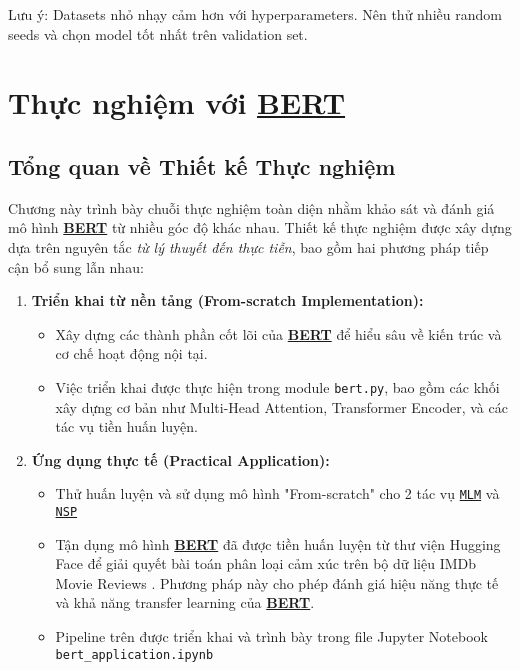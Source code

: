 Lưu ý: Datasets nhỏ nhạy cảm hơn với hyperparameters. Nên thử nhiều random seeds và chọn model tốt nhất trên validation set.

\section{Thực nghiệm với \hyperref[acro:bert]{\textbf{BERT}}}
\label{sec:thuc_nghiem_bert}

\subsection{Tổng quan về Thiết kế Thực nghiệm}
\label{ssec:tong_quan_thiet_ke_thuc_nghiem}

Chương này trình bày chuỗi thực nghiệm toàn diện nhằm khảo sát và đánh giá mô hình \hyperref[acro:bert]{\textbf{BERT}} từ nhiều góc độ khác nhau. Thiết kế thực nghiệm được xây dựng dựa trên nguyên tắc \textit{từ lý thuyết đến thực tiễn}, bao gồm hai phương pháp tiếp cận bổ sung lẫn nhau:

\begin{enumerate}
    \item \textbf{Triển khai từ nền tảng (From-scratch Implementation):} 
    \begin{itemize}
        \item Xây dựng các thành phần cốt lõi của \hyperref[acro:bert]{\textbf{BERT}} để hiểu sâu về kiến trúc và cơ chế hoạt động nội tại. 
        \item Việc triển khai được thực hiện trong module \texttt{bert.py}, bao gồm các khối xây dựng cơ bản như Multi-Head Attention, Transformer Encoder, và các tác vụ tiền huấn luyện.
    \end{itemize}
    
    \item \textbf{Ứng dụng thực tế (Practical Application):} 
    \begin{itemize}
        \item Thử huấn luyện và sử dụng mô hình "From-scratch" cho 2 tác vụ \hyperref[acro:mlm]{\texttt{MLM}} và \hyperref[acro:nsp]{\texttt{NSP}}
        \item Tận dụng mô hình \hyperref[acro:bert]{\textbf{BERT}} đã được tiền huấn luyện từ thư viện Hugging Face \cite{wolf2019huggingface} để giải quyết bài toán phân loại cảm xúc trên bộ dữ liệu IMDb Movie Reviews \cite{maas2011learning}. Phương pháp này cho phép đánh giá hiệu năng thực tế và khả năng transfer learning của \hyperref[acro:bert]{\textbf{BERT}}.
        \item Pipeline trên được triển khai và trình bày trong file Jupyter Notebook \texttt{bert\_application.ipynb}
    \end{itemize}
\end{enumerate}

